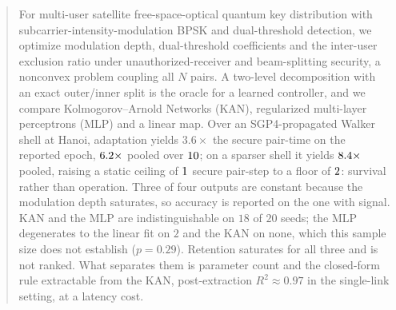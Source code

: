\begin{abstract}
For multi-user satellite free-space-optical quantum key distribution with
subcarrier-intensity-modulation BPSK and dual-threshold detection, we optimize
modulation depth, dual-threshold coefficients and the inter-user exclusion ratio under
unauthorized-receiver and beam-splitting security, a nonconvex problem coupling all $N$
pairs. A two-level decomposition with an exact outer/inner split is the oracle for a
learned controller, and we compare Kolmogorov--Arnold Networks (KAN), regularized
multi-layer perceptrons (MLP) and a linear map. Over an SGP4-propagated Walker shell at
Hanoi, adaptation yields $3.6\times$ the secure pair-time on the reported epoch,
$\rLongRatio\times$ pooled over $\rLongEpochs$; on a sparser shell it yields
$\rSparseRatio\times$ pooled, raising a static ceiling of $\rSparseStatHi$ secure
pair-step to a floor of $\rSparseAdaptLo$: survival rather than operation.
Three of four outputs are constant because the modulation depth saturates, so accuracy
is reported on the one with signal. KAN and the MLP are indistinguishable on $18$ of $20$
seeds; the MLP degenerates to the linear fit on $2$ and the KAN on none, which
this sample size does not establish ($p=0.29$). Retention saturates
for all three and is not ranked. What separates them is parameter count and the
closed-form rule extractable from the KAN, post-extraction $R^2 \approx 0.97$ in the
single-link setting, at a latency cost.
\end{abstract}
